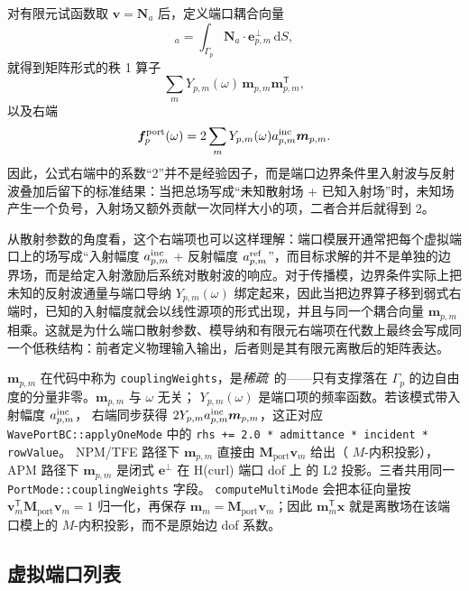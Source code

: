 \documentclass[UTF8,a4paper,11pt]{ctexart}
\newcommand{\dd}{\mathrm{d}}
\newcommand{\transpose}{\mathsf{T}}
\newcommand{\Ne}{\bm{N}}
\newcommand{\code}[1]{\texttt{\small #1}}
\begin{document}
对有限元试函数取 \(\bm v=\Ne_a\) 后，定义端口耦合向量
\begin{equation}
    [\bm m_{p,m}]_a=\int_{\Gamma_p}\Ne_a\cdot\bm e_{p,m}^{\perp}\,\dd S,
\end{equation}
就得到矩阵形式的秩 1 算子
\begin{equation}
    \sum_mY_{p,m}(\omega)\,\bm m_{p,m}\bm m_{p,m}^{\transpose},
    \label{eq:m_p}
\end{equation}
以及右端
\begin{equation}
    \bm f_{p}^{\rm port}(\omega)=2\sum_mY_{p,m}(\omega)a_{p,m}^{\rm inc}\bm m_{p,m}.
\end{equation}
因此，公式右端中的系数“2”并不是经验因子，而是端口边界条件里入射波与反射波叠加后留下的标准结果：当把总场写成“未知散射场 + 已知入射场”时，未知场产生一个负号，入射场又额外贡献一次同样大小的项，二者合并后就得到 2。

从散射参数的角度看，这个右端项也可以这样理解：端口模展开通常把每个虚拟端口上的场写成“入射幅度 $a_{p,m}^{\rm inc}$ + 反射幅度 $a_{p,m}^{\rm ref}$”，而目标求解的并不是单独的边界场，而是给定入射激励后系统对散射波的响应。对于传播模，边界条件实际上把未知的反射波通量与端口导纳 $Y_{p,m}(\omega)$ 绑定起来，因此当把边界算子移到弱式右端时，已知的入射幅度就会以线性源项的形式出现，并且与同一个耦合向量 $\bm m_{p,m}$ 相乘。这就是为什么端口散射参数、模导纳和有限元右端项在代数上最终会写成同一个低秩结构：前者定义物理输入输出，后者则是其有限元离散后的矩阵表达。

$\bm m_{p,m}$ 在代码中称为 \code{couplingWeights}，是\emph{稀疏}\ 的——只有支撑落在
$\Gamma_p$ 的边自由度的分量非零。$\bm m_{p,m}$ 与 $\omega$ 无关；
$Y_{p,m}(\omega)$ 是端口项的频率函数。若该模式带入射幅度 $a_{p,m}^{\rm inc}$，
右端同步获得 $2Y_{p,m}a_{p,m}^{\rm inc}\bm m_{p,m}$，这正对应
\code{WavePortBC::applyOneMode} 中的 \code{rhs += 2.0 * admittance * incident * rowValue}。
NPM/TFE 路径下 $\bm m_{p,m}$ 直接由 $\bm M_{\text{port}}\bm v_m$ 给出（
$M$-内积投影），APM 路径下 $\bm m_{p,m}$ 是闭式 $\bm e^{\perp}$ 在 H(curl) 端口 dof 上
的 L2 投影。三者共用同一 \code{PortMode::couplingWeights} 字段。
\code{computeMultiMode} 会把本征向量按 $\bm v_m^{\transpose}\bm M_{\text{port}}\bm v_m=1$
归一化，再保存 $\bm m_m=\bm M_{\text{port}}\bm v_m$；因此
$\bm m_m^{\transpose}\bm x$ 就是离散场在该端口模上的 $M$-内积投影，而不是原始边 dof 系数。

\subsection{虚拟端口列表}
\end{document}
